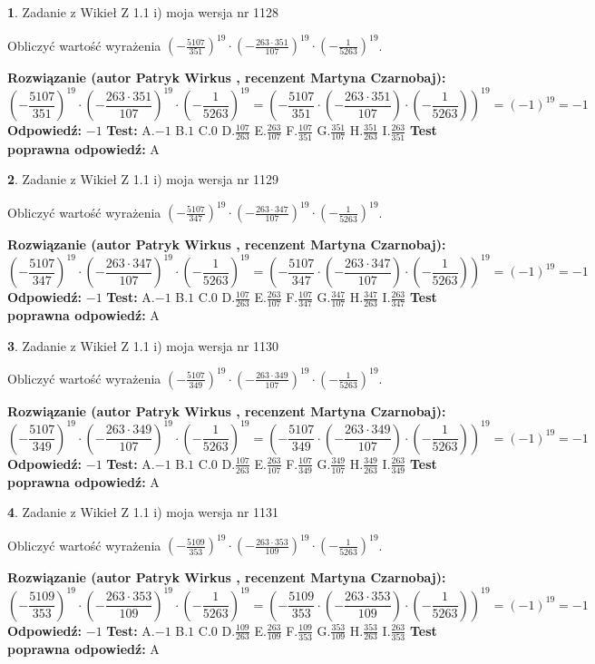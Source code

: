 \documentclass[12pt, a4paper]{article}
\theoremstyle{definition} %
\newtheorem{zad}{}
\newcommand{\zadStart}[1]{\begin{zad}#1\newline}
\newcommand{\zadStop}{\end{zad}}
\newcommand{\rozwStart}[2]{\noindent \textbf{Rozwiązanie (autor #1 , recenzent #2): }\newline}
\newcommand{\rozwStop}{\newline}
\newcommand{\odpStart}{\noindent \textbf{Odpowiedź:}\newline}
\newcommand{\odpStop}{\newline}
\newcommand{\testStart}{\noindent \textbf{Test:}\newline}
\newcommand{\testStop}{\newline}
\newcommand{\kluczStart}{\noindent \textbf{Test poprawna odpowiedź:}\newline}
\newcommand{\kluczStop}{\newline}
\begin{document}
\zadStart{Zadanie z Wikieł Z 1.1 i) moja wersja nr 1128}

Obliczyć wartość wyrażenia $(-\frac{5107}{351})^{19} \cdot (-\frac{263 \cdot 351}{107})^{19} \cdot (-\frac{1}{5263})^{19}$.
\zadStop
\rozwStart{Patryk Wirkus}{Martyna Czarnobaj}
$$(-\frac{5107}{351})^{19} \cdot (-\frac{263 \cdot 351}{107})^{19} \cdot (-\frac{1}{5263})^{19} = (-\frac{5107}{351} \cdot (-\frac{263 \cdot 351}{107}) \cdot (-\frac{1}{5263}))^{19} = (-1)^{19} = -1$$
\rozwStop
\odpStart
$-1$
\odpStop
\testStart
A.$-1$ B.$1$ C.$0$ D.$\frac{107}{263}$ E.$\frac{263}{107}$
F.$\frac{107}{351}$ G.$\frac{351}{107}$
H.$\frac{351}{263}$
I.$\frac{263}{351}$
\testStop
\kluczStart
A
\kluczStop



\zadStart{Zadanie z Wikieł Z 1.1 i) moja wersja nr 1129}

Obliczyć wartość wyrażenia $(-\frac{5107}{347})^{19} \cdot (-\frac{263 \cdot 347}{107})^{19} \cdot (-\frac{1}{5263})^{19}$.
\zadStop
\rozwStart{Patryk Wirkus}{Martyna Czarnobaj}
$$(-\frac{5107}{347})^{19} \cdot (-\frac{263 \cdot 347}{107})^{19} \cdot (-\frac{1}{5263})^{19} = (-\frac{5107}{347} \cdot (-\frac{263 \cdot 347}{107}) \cdot (-\frac{1}{5263}))^{19} = (-1)^{19} = -1$$
\rozwStop
\odpStart
$-1$
\odpStop
\testStart
A.$-1$ B.$1$ C.$0$ D.$\frac{107}{263}$ E.$\frac{263}{107}$
F.$\frac{107}{347}$ G.$\frac{347}{107}$
H.$\frac{347}{263}$
I.$\frac{263}{347}$
\testStop
\kluczStart
A
\kluczStop



\zadStart{Zadanie z Wikieł Z 1.1 i) moja wersja nr 1130}

Obliczyć wartość wyrażenia $(-\frac{5107}{349})^{19} \cdot (-\frac{263 \cdot 349}{107})^{19} \cdot (-\frac{1}{5263})^{19}$.
\zadStop
\rozwStart{Patryk Wirkus}{Martyna Czarnobaj}
$$(-\frac{5107}{349})^{19} \cdot (-\frac{263 \cdot 349}{107})^{19} \cdot (-\frac{1}{5263})^{19} = (-\frac{5107}{349} \cdot (-\frac{263 \cdot 349}{107}) \cdot (-\frac{1}{5263}))^{19} = (-1)^{19} = -1$$
\rozwStop
\odpStart
$-1$
\odpStop
\testStart
A.$-1$ B.$1$ C.$0$ D.$\frac{107}{263}$ E.$\frac{263}{107}$
F.$\frac{107}{349}$ G.$\frac{349}{107}$
H.$\frac{349}{263}$
I.$\frac{263}{349}$
\testStop
\kluczStart
A
\kluczStop



\zadStart{Zadanie z Wikieł Z 1.1 i) moja wersja nr 1131}

Obliczyć wartość wyrażenia $(-\frac{5109}{353})^{19} \cdot (-\frac{263 \cdot 353}{109})^{19} \cdot (-\frac{1}{5263})^{19}$.
\zadStop
\rozwStart{Patryk Wirkus}{Martyna Czarnobaj}
$$(-\frac{5109}{353})^{19} \cdot (-\frac{263 \cdot 353}{109})^{19} \cdot (-\frac{1}{5263})^{19} = (-\frac{5109}{353} \cdot (-\frac{263 \cdot 353}{109}) \cdot (-\frac{1}{5263}))^{19} = (-1)^{19} = -1$$
\rozwStop
\odpStart
$-1$
\odpStop
\testStart
A.$-1$ B.$1$ C.$0$ D.$\frac{109}{263}$ E.$\frac{263}{109}$
F.$\frac{109}{353}$ G.$\frac{353}{109}$
H.$\frac{353}{263}$
I.$\frac{263}{353}$
\testStop
\kluczStart
A
\kluczStop
\end{document}
